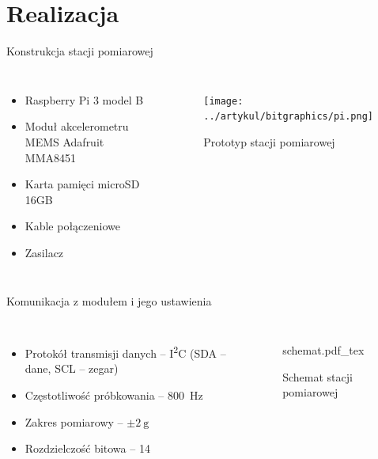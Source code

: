 \documentclass[aspectratio=1610,polish]{beamer} %
\begin{document}
  \section{Realizacja}
  \begin{frame}{Konstrukcja stacji pomiarowej}
    \begin{columns}
      \begin{itemize}
	\item Raspberry Pi 3 model B
	\item Moduł akcelerometru MEMS Adafruit MMA8451
	\item Karta pamięci microSD 16GB
	\item Kable połączeniowe
	\item Zasilacz
      \end{itemize}
      \begin{figure}
	\texttt{[image: ../artykul/bitgraphics/pi.png]}
	\caption{Prototyp stacji pomiarowej}
      \end{figure}
    \end{columns}
  \end{frame}
  \begin{frame}{Komunikacja z modułem i jego ustawienia}
    \begin{columns}
      \begin{itemize}
	\item Protokół transmisji danych -- I\textsuperscript{2}C (SDA -- dane,
	  SCL -- zegar)
	\item Częstotliwość próbkowania -- \SI{800}{\hertz}
  \item Zakres pomiarowy -- $\pm\SI{2}{\g}$
  \item Rozdzielczość bitowa -- \SI{14}{\bit}
      \end{itemize}
      \begin{figure}
	{schemat.pdf_tex}
	\caption{Schemat stacji pomiarowej}
      \end{figure}
    \end{columns}
  \end{frame}
\end{document}
